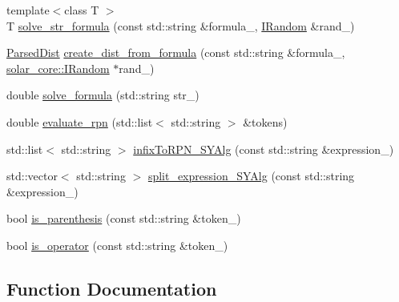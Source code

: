 \begin{DoxyCompactItemize}
\item 
{\footnotesize template$<$class T $>$ }\\T \hyperlink{namespaceserialize_aa5ee0bad0c960a3f06430066217d8c12}{solve\+\_\+str\+\_\+formula} (const std\+::string \&formula\+\_\+, \hyperlink{classsolar__core_1_1_i_random}{I\+Random} \&rand\+\_\+)
\item 
\hyperlink{classserialize_1_1_parsed_dist}{Parsed\+Dist} \hyperlink{namespaceserialize_a1cef1f38ab16dc50b42af0694fc4160f}{create\+\_\+dist\+\_\+from\+\_\+formula} (const std\+::string \&formula\+\_\+, \hyperlink{classsolar__core_1_1_i_random}{solar\+\_\+core\+::\+I\+Random} $\ast$rand\+\_\+)
\end{DoxyCompactItemize}
{\bf }\par
\begin{DoxyCompactItemize}
\item 
double \hyperlink{namespaceserialize_a8efbe7c32352f8ff750211235e3d5361}{solve\+\_\+formula} (std\+::string str\+\_\+)
\item 
double \hyperlink{namespaceserialize_ade99c17935e107385ad259ba3111457e}{evaluate\+\_\+rpn} (std\+::list$<$ std\+::string $>$ \&tokens)
\item 
std\+::list$<$ std\+::string $>$ \hyperlink{namespaceserialize_a2876e5d84edeaa969e25a176eb582bb3}{infix\+To\+R\+P\+N\+\_\+\+S\+Y\+Alg} (const std\+::string \&expression\+\_\+)
\item 
std\+::vector$<$ std\+::string $>$ \hyperlink{namespaceserialize_a06d144912d025816fe84c532295d274a}{split\+\_\+expression\+\_\+\+S\+Y\+Alg} (const std\+::string \&expression\+\_\+)
\item 
bool \hyperlink{namespaceserialize_a38acccd96ada5f0927f924531ac1498e}{is\+\_\+parenthesis} (const std\+::string \&token\+\_\+)
\item 
bool \hyperlink{namespaceserialize_a897be0f6c9fe37021e11bfeb732d3500}{is\+\_\+operator} (const std\+::string \&token\+\_\+)
\end{DoxyCompactItemize}



\subsection{Function Documentation}
\hypertarget{namespaceserialize_a1cef1f38ab16dc50b42af0694fc4160f}{}
